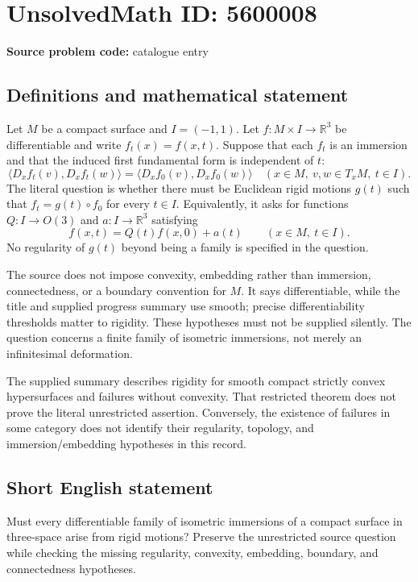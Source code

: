 \documentclass[11pt]{article}
\newcommand{\R}{\mathbb{R}}
\begin{document}
\section*{UnsolvedMath ID: 5600008}
\textbf{Source problem code:} catalogue entry
\subsection{Definitions and mathematical statement}
Let $M$ be a compact surface and $I=(-1,1)$. Let $f:M\times I\to\R^3$ be differentiable and write $f_t(x)=f(x,t)$. Suppose that each $f_t$ is an immersion and that the induced first fundamental form is independent of $t$:
\[
\langle D_xf_t(v),D_xf_t(w)\rangle
=\langle D_xf_0(v),D_xf_0(w)\rangle
\quad(x\in M,\ v,w\in T_xM,\ t\in I).
\]
The literal question is whether there must be Euclidean rigid motions $g(t)$ such that $f_t=g(t)\circ f_0$ for every $t\in I$. Equivalently, it asks for functions $Q:I\to O(3)$ and $a:I\to\R^3$ satisfying
\[
f(x,t)=Q(t)f(x,0)+a(t)\qquad(x\in M,\ t\in I).
\]
No regularity of $g(t)$ beyond being a family is specified in the question.

The source does not impose convexity, embedding rather than immersion, connectedness, or a boundary convention for $M$. It says differentiable, while the title and supplied progress summary use smooth; precise differentiability thresholds matter to rigidity. These hypotheses must not be supplied silently. The question concerns a finite family of isometric immersions, not merely an infinitesimal deformation.

The supplied summary describes rigidity for smooth compact strictly convex hypersurfaces and failures without convexity. That restricted theorem does not prove the literal unrestricted assertion. Conversely, the existence of failures in some category does not identify their regularity, topology, and immersion/embedding hypotheses in this record.
\subsection{Short English statement}
Must every differentiable family of isometric immersions of a compact surface in three-space arise from rigid motions? Preserve the unrestricted source question while checking the missing regularity, convexity, embedding, boundary, and connectedness hypotheses.
\end{document}
